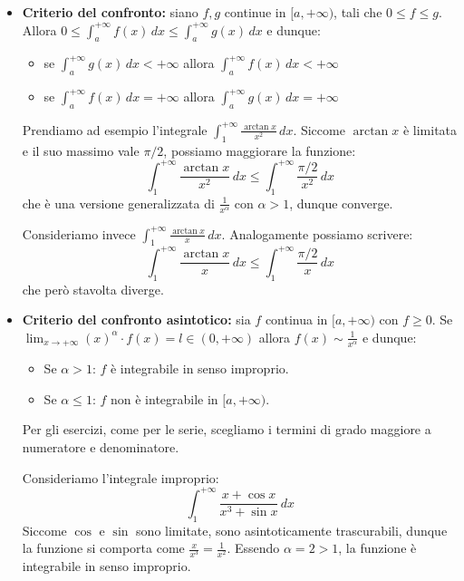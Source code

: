 \documentclass[12pt]{report}
\begin{document}
	\begin{itemize}
		
		\item \textbf{Criterio del confronto:} siano $f, g$ continue in $[a, +\infty)$, tali che $0 \le f \le g$.
		Allora $0 \le \int_{a}^{+\infty} f(x) \, dx \le \int_{a}^{+\infty} g(x) \, dx$ e dunque:
		\begin{itemize}
			
			\item se $\int_{a}^{+\infty} g(x) \, dx < +\infty$ allora $\int_{a}^{+\infty} f(x) \, dx < +\infty$
			
			\item se $\int_{a}^{+\infty} f(x) \, dx = +\infty$ allora $\int_{a}^{+\infty} g(x) \, dx = +\infty$
			
		\end{itemize}
		
		\begin{osservazione}{}{}
			
			Prendiamo ad esempio l'integrale $\int_{1}^{+\infty} \frac{\arctan x}{x^2} \, dx$. 
			Siccome $\arctan x$ è limitata e il suo massimo vale $\pi/2$, possiamo maggiorare la funzione:
			\[
			\int_{1}^{+\infty} \frac{\arctan x}{x^2} \, dx \le \int_{1}^{+\infty} \frac{\pi/2}{x^2} \, dx
			\]
			che è una versione generalizzata di $\frac{1}{x^\alpha}$ con $\alpha > 1$, dunque converge.
			
			Consideriamo invece $\int_{1}^{+\infty} \frac{\arctan x}{x} \, dx$. Analogamente possiamo scrivere:
			\[
			\int_{1}^{+\infty} \frac{\arctan x}{x} \, dx \le \int_{1}^{+\infty} \frac{\pi/2}{x} \, dx
			\]
			che però stavolta diverge.
			
		\end{osservazione}
		
		\item \textbf{Criterio del confronto asintotico:} sia $f$ continua in $[a, +\infty)$ con $f \ge 0$.
		Se $\lim_{x \to +\infty} (x)^\alpha \cdot f(x) = l \in (0, +\infty)$ allora $f(x) \sim \frac{1}{x^\alpha}$ e dunque:
		\begin{itemize}
			\item Se $\alpha > 1$: $f$ è integrabile in senso improprio.
			\item Se $\alpha \le 1$: $f$ non è integrabile in $[a, +\infty)$.
		\end{itemize}
		
		Per gli esercizi, come per le serie, scegliamo i termini di grado maggiore a numeratore e denominatore.
		
		\begin{osservazione}{}{}
			Consideriamo l'integrale improprio:
			\[
			\int_{1}^{+\infty} \frac{x + \cos x}{x^3 + \sin x} \, dx
			\]
			Siccome $\cos$ e $\sin$ sono limitate, sono asintoticamente trascurabili, dunque la funzione si comporta come $\frac{x}{x^3} = \frac{1}{x^2}$.
			Essendo $\alpha = 2 > 1$, la funzione è integrabile in senso improprio.
		\end{osservazione}
		
	\end{itemize}
	
\end{document}
